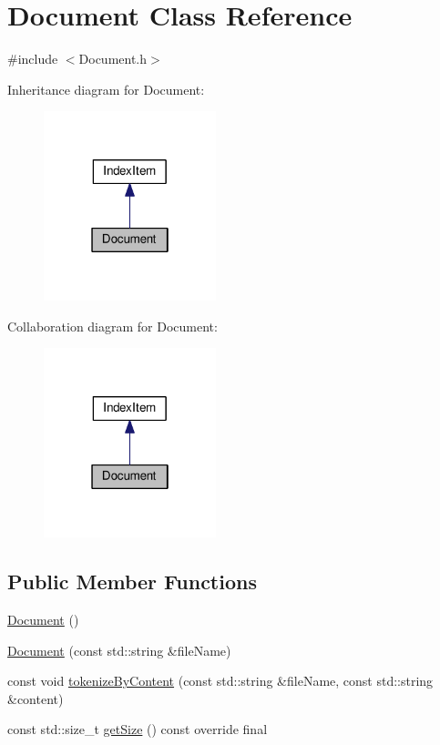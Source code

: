 \hypertarget{classDocument}{}\section{Document Class Reference}
\label{classDocument}


{\ttfamily \#include $<$Document.\+h$>$}



Inheritance diagram for Document\+:\nopagebreak
\begin{figure}[H]
\begin{center}
\leavevmode
\includegraphics[width=142pt]{classDocument__inherit__graph}
\end{center}
\end{figure}


Collaboration diagram for Document\+:\nopagebreak
\begin{figure}[H]
\begin{center}
\leavevmode
\includegraphics[width=142pt]{classDocument__coll__graph}
\end{center}
\end{figure}
\subsection*{Public Member Functions}
\begin{DoxyCompactItemize}
\item 
\hyperlink{classDocument_acdbcbe550084e8c20f4f67eb229ad66a}{Document} ()
\item 
\hyperlink{classDocument_a11e577354c64a23106b0cf34c11e712f}{Document} (const std\+::string \&file\+Name)
\item 
const void \hyperlink{classDocument_a9c9a23f1b4651aff6b885c2a69bc76d2}{tokenize\+By\+Content} (const std\+::string \&file\+Name, const std\+::string \&content)
\item 
const std\+::size\+\_\+t \hyperlink{classDocument_a81ccfd6f3de713047ccb52a45842dc26}{get\+Size} () const override final
\end{DoxyCompactItemize}
